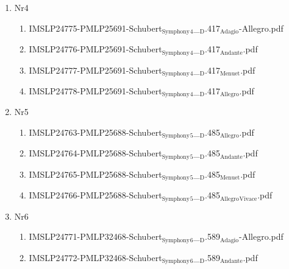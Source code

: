 \documentclass[11pt]{article}
\begin{document}
\begin{enumerate}
\begin{enumerate}
\item Nr4
\label{sec-1-1-1-1-44-60-5-7}
\begin{enumerate}
\item IMSLP24775-PMLP25691-Schubert$_{\text{Symphony}}$$_{\text{4}}$\_$_{\text{D}}$.417$_{\text{Adagio}}$-Allegro.pdf
\label{sec-1-1-1-1-44-60-5-7-1}

\item IMSLP24776-PMLP25691-Schubert$_{\text{Symphony}}$$_{\text{4}}$\_$_{\text{D}}$.417$_{\text{Andante}}$.pdf
\label{sec-1-1-1-1-44-60-5-7-2}

\item IMSLP24777-PMLP25691-Schubert$_{\text{Symphony}}$$_{\text{4}}$\_$_{\text{D}}$.417$_{\text{Menuet}}$.pdf
\label{sec-1-1-1-1-44-60-5-7-3}

\item IMSLP24778-PMLP25691-Schubert$_{\text{Symphony}}$$_{\text{4}}$\_$_{\text{D}}$.417$_{\text{Allegro}}$.pdf
\label{sec-1-1-1-1-44-60-5-7-4}
\end{enumerate}

\item Nr5
\label{sec-1-1-1-1-44-60-5-8}
\begin{enumerate}
\item IMSLP24763-PMLP25688-Schubert$_{\text{Symphony}}$$_{\text{5}}$\_$_{\text{D}}$.485$_{\text{Allegro}}$.pdf
\label{sec-1-1-1-1-44-60-5-8-1}

\item IMSLP24764-PMLP25688-Schubert$_{\text{Symphony}}$$_{\text{5}}$\_$_{\text{D}}$.485$_{\text{Andante}}$.pdf
\label{sec-1-1-1-1-44-60-5-8-2}

\item IMSLP24765-PMLP25688-Schubert$_{\text{Symphony}}$$_{\text{5}}$\_$_{\text{D}}$.485$_{\text{Menuet}}$.pdf
\label{sec-1-1-1-1-44-60-5-8-3}

\item IMSLP24766-PMLP25688-Schubert$_{\text{Symphony}}$$_{\text{5}}$\_$_{\text{D}}$.485$_{\text{Allegro}}$$_{\text{Vivace}}$.pdf
\label{sec-1-1-1-1-44-60-5-8-4}
\end{enumerate}

\item Nr6
\label{sec-1-1-1-1-44-60-5-9}
\begin{enumerate}
\item IMSLP24771-PMLP32468-Schubert$_{\text{Symphony}}$$_{\text{6}}$\_$_{\text{D}}$.589$_{\text{Adagio}}$-Allegro.pdf
\label{sec-1-1-1-1-44-60-5-9-1}

\item IMSLP24772-PMLP32468-Schubert$_{\text{Symphony}}$$_{\text{6}}$\_$_{\text{D}}$.589$_{\text{Andante}}$.pdf
\label{sec-1-1-1-1-44-60-5-9-2}


\end{enumerate}
\end{enumerate}
\end{enumerate}
\end{document}
